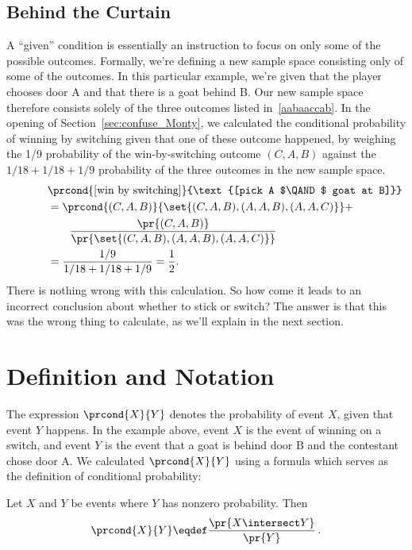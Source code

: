 \subsection{Behind the Curtain}

A ``given'' condition is essentially an instruction to focus on only
some of the possible outcomes.  Formally, we're defining a new sample
space consisting only of some of the outcomes.  In this particular
example, we're given that the player chooses door A and that there is
a goat behind B.  Our new sample space therefore consists solely of
the three outcomes listed in~\eqref{aabaaccab}.  In the opening of
Section~\ref{sec:confuse_Monty}, we calculated the conditional
probability of winning by switching given that one of these outcome
happened, by weighing the 1/9 probability of the win-by-switching
outcome $(C, A, B)$ against the $1/18 + 1/18 + 1/9$ probability of
the three outcomes in the new sample space.
\begin{align*}
\lefteqn{\prcond{\text{[win by switching]}}{\text{[pick A $\QAND$ goat at B]}}}\\
  & = \prcond{(C, A, B)}{\set{(C, A, B),(A, A, B),(A, A, C)}} +\\
  & \qquad \frac{\pr{(C, A, B)}}{\pr{\set{(C, A, B),(A, A, B),(A, A, C)}}}\\
  & = \frac{1/9}{1/18 + 1/18 + 1/9} = \frac{1}{2}.
\end{align*}
There is nothing wrong with this calculation.  So how come it leads to
an incorrect conclusion about whether to stick or switch?  The answer
is that this was the wrong thing to calculate, as we'll explain in the
next section.

\section{Definition and Notation}

The expression $\prcond{X}{Y}$ denotes the probability of event $X$,
given that event $Y$ happens.  In the example above, event $X$ is the
event of winning on a switch, and event $Y$ is the event that a goat
is behind door B and the contestant chose door A.  We calculated
$\prcond{X}{Y}$ using a formula which serves as the definition of
conditional probability:
\begin{definition}\label{LN12:prcond}
Let $X$ and $Y$ be events where $Y$ has nonzero probability.  Then
\[
\prcond{X}{Y} \eqdef \frac{\pr{X \intersect Y}}{\pr{Y}}\,.
\]
\end{definition}

